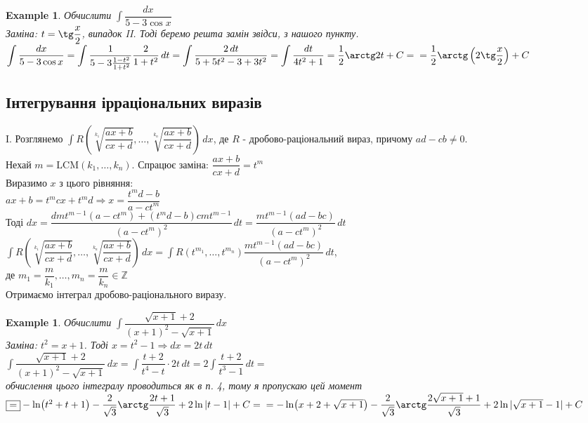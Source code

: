 \documentclass[a4paper, 10pt]{article}
\def\huge{\displaystyle}
\theoremstyle{theoremdd}
\theoremstyle{theoremdd}
\theoremstyle{theoremdd}
\theoremstyle{theoremdd}
\newtheorem{example}[theorem]{Example}
\theoremstyle{theoremdd}
\theoremstyle{theoremdd}
\theoremstyle{theoremdd}
\theoremstyle{theoremdd}
\begin{document}
\begin{example}
Обчислити $\huge \int \dfrac{dx}{5-3\cos x}$\\
Заміна: $t = \tg \dfrac{x}{2}$, випадок II. Тоді беремо решта замін звідси, з нашого пункту.\\
$\huge \int \dfrac{dx}{5-3\cos x} = \int \dfrac{1}{5-3 \frac{1-t^2}{1+t^2}} \dfrac{2}{1+t^2}\,dt = \int \dfrac{2\,dt}{5+5t^2-3+3t^2} = \int \dfrac{dt}{4t^2+1} = \dfrac{1}{2} \arctg 2t + C = \\ = \dfrac{1}{2} \arctg \left(2 \tg \dfrac{x}{2} \right) + C$
\end{example}

\subsection{Інтегрування ірраціональних виразів}

I. Розглянемо $\huge \int R\left( \sqrt[k_1]{\dfrac{ax+b}{cx+d}}, \dots, \sqrt[k_n]{\dfrac{ax+b}{cx+d}} \right)\,dx$, де $R$ - дробово-раціональний вираз, причому $ad-cb \neq 0$.\\
Нехай $m = \textrm{LCM} (k_1,\dots,k_n)$. Спрацює заміна: $\dfrac{ax+b}{cx+d} = t^m$\\
Виразимо $x$ з цього рівняння:\\
$ax+b =t^m cx + t^m d \Rightarrow x = \dfrac{t^md-b}{a-ct^m}$\\
Тоді $dx = \dfrac{dmt^{m-1}(a-ct^m) + (t^md-b)cmt^{m-1}}{(a-ct^m)^2}\,dt = \dfrac{mt^{m-1}(ad-bc)}{(a-ct^m)^2}\,dt$\\
$\huge \int R\left( \sqrt[k_1]{\dfrac{ax+b}{cx+d}}, \dots, \sqrt[k_n]{\dfrac{ax+b}{cx+d}} \right)\,dx = \int R(t^{m_1},\dots,t^{m_n}) \dfrac{mt^{m-1}(ad-bc)}{(a-ct^m)^2}\,dt$,\\
де $m_1 = \dfrac{m}{k_1},\dots,m_n = \dfrac{m}{k_n} \in \mathbb{Z}$\\
Отримаємо інтеграл дробово-раціонального виразу.

\begin{example}
Обчислити $\huge \int \dfrac{\sqrt{x+1}+2}{(x+1)^2 - \sqrt{x+1}}\,dx$\\
Заміна: $t^2 = x+1$. Тоді $x = t^2 -1 \Rightarrow dx = 2t \,dt$\\
$\huge \int \dfrac{\sqrt{x+1}+2}{(x+1)^2 - \sqrt{x+1}}\,dx = \int \dfrac{t+2}{t^4-t} \cdot 2t\,dt = 2 \int \dfrac{t+2}{t^3-1}\,dt \boxed{=}$\\
обчислення цього інтегралу проводиться як в п. 4, тому я пропускаю цей момент\\
$\boxed{=} -\ln(t^2+t+1) - \dfrac{2}{\sqrt{3}} \arctg \dfrac{2t+1}{\sqrt{3}} + 2 \ln|t-1|+ C = \\
= -\ln(x+2+\sqrt{x+1}) - \dfrac{2}{\sqrt{3}} \arctg \dfrac{2\sqrt{x+1}+1}{\sqrt{3}} + 2 \ln|\sqrt{x+1}-1| + C$
\end{example}
\end{document}
